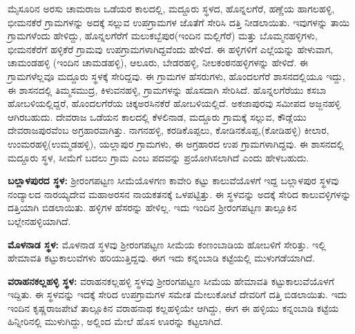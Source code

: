 \vskip -1pt

ಮೈಸೂರಿನ ಅರಸು ಚಾಮರಾಜ ಒಡೆಯರ ಕಾಲದಲ್ಲಿ, ಮದ್ದೂರು ಸ್ಥಳದ, ಹೊನ್ನಲಗೆರೆ, ಹಣ್ಣೆಯ ಹಾಗಲಹಳ್ಳಿ, ಭೀಮನಕೆರೆ ಗ್ರಾಮಗಳನ್ನು ಅದಕ್ಕೆ ಸಲ್ಲುವ ಉಪಗ್ರಾಮಗಳ ಜೊತೆಗೆ ಸೇರಿಸಿ ದತ್ತಿ ನೀಡಲಾಯಿತು. ಇವುಗಳನ್ನು ತಾಯಿ ಗ್ರಾಮಗಳೆಂದು ಹೇಳಿದ್ದು, ಹೊನ್ನಲಗೆರೆಗೆ ಮಲುಕಬ್ಬೆಪುರ(ಇಂದಿನ ಮಲ್ಲಿಗೆರೆ) ಮತ್ತು ಬೊಮ್ಮನಹಳ್ಳಿಗಳು, ಭೀಮನಕೆರೆಗೆ ಹಳ್ಳಿಕೆರೆ ಗ್ರಾಮವು ಉಪಗ್ರಾಮಗಳಾಗಿದ್ದವೆಂದು ಹೇಳಿದೆ. ಈ ಹಳ್ಳಿಗಳಿಗೆ ಎಲ್ಲೆಯನ್ನು ಹೇಳುವಾಗ, ಚಾಮಂಡಹಳ್ಳಿ (ಇಂದಿನ ಚಾಮಡಹಳ್ಳಿ), ಆಲೂರು, ಬೇಡರಹಳ್ಳಿ, ನೀಲಕಂಠನಹಳ್ಳಿಗಳನ್ನು ಹೇಳಿದೆ. ಈ ಗ್ರಾಮಗಳೆಲ್ಲವೂ ಮದ್ದೂರು ಸ್ಥಳಕ್ಕೆ ಸೇರಿದ್ದವು. ಈ ಗ್ರಾಮಗಳ ಹೆಸರುಗಳು, ಹೊಂದಲಗೆರೆ ಶಾಸನದಲ್ಲಿಯೂ ಇದ್ದು, ಈ ಶಾಸನದಲ್ಲಿ ತಿಮ್ಮಸಮುದ್ರ, ಕಿಳುವನಹಳ್ಳಿ, ಗ್ರಾಮಗಳನ್ನು ಹೊಸದಾಗಿ ಸೇರಿಸಿದೆ. ಹೊನ್ನಲಗೆರೆಯು ಕಸಬಾ ಹೋಬಳಿಯಲ್ಲಿದ್ದರೆ, ಹೊಂದಲಗೆರೆಯ ಚಿಕ್ಕಅರಸಿನಕೆರೆ ಹೋಬಳಿಯಲ್ಲಿದೆ. ಅಕಜಾಪುರವು ಸಮೀಪದ ಅಜ್ಜನಹಳ್ಳಿ ಆಗಿರಬಹುದು. ದೇವರಾಜ ಒಡೆಯನ ಕಾಲದಲ್ಲಿ ಕೆಳಲಿನಾಡ, ಮದ್ದೂರು ಗ್ರಾಮಕ್ಕೆ ಸಲ್ಲುವ, ಕೌಡ್ಲೆಯು ದೇವರಾಜಪುರವೆಂಬ ಅಗ್ರಹಾರವಾಗಿತ್ತು. ನಾಗನಹಳ್ಳಿ, ಕರಡಿಕೊಪ್ಪಲು, ಕೋಡಿನಕೊಪ್ಪ,(ಕೋಡಿಹಳ್ಳಿ) ಕೀಲಾರ, ಉಂಮರಹಳ್ಳಿ(ಉಮ್ಮಡಹಳ್ಳಿ), ಯಲ್ಲಾಪುರ ಗ್ರಾಮಗಳು, ಈ ಅಗ್ರಹಾರದ ಉಪ ಗ್ರಾಮಗಳಾಗಿದ್ದವು. ಈ ಶಾಸನದಲ್ಲಿ ಮದ್ದೂರು ಸ್ಥಳ, ಸೀಮೆಗೆ ಬದಲು ಗ್ರಾಮ ಎಂಬ ಪದವನ್ನು ಪ್ರಯೋಗಿಸಲಾಗಿದೆ ಎಂದು ಹೇಳಬಹುದು.

\textbf{ಬಲ್ಲಾಳಪುರದ ಸ್ಥಳ:} ಶ‍್ರೀರಂಗಪಟ್ಟಣ ಸೀಮೆಯೊಳಗಣ ಕಾವೇರಿ ಕಟ್ಟು ಕಾಲುವೆಯೊಳಗೆ ಇದ್ದ ಬಲ್ಲಾಳಪುರ ಸ್ಥಳವು ನಂದ್ಯಾಲದ ನಾರಯ್ಯದೇವ ಮಹಾಅರಸನ ನಾಯಕತನಕ್ಕೆ ಒಳಪಟ್ಟಿತ್ತು. ಈ ಸ್ಥಳವನ್ನು ಅದಕ್ಕೆ ಸೇರಿದ ಕಾಲುವಳ್ಳಿಗಳನ್ನು ದತ್ತಿಯಾಗಿ ಬಿಡಲಾಯಿತು. ಹಳ್ಳಿಗಳ ಹೆಸರನ್ನು ಹೇಳಿಲ್ಲ. ಇದು ಇಂದಿನ ಶ‍್ರೀರಂಗಪಟ್ಟಣ ತಾಲ್ಲೂಕಿನ ಬಲ್ಲೇನಹಳ್ಳಿಯಾಗಿದೆ.

\textbf{ಮೊಳನಾಡ ಸ್ಥಳ:} ಮೊಳನಾಡ ಸ್ಥಳವು ಶ‍್ರೀರಂಗಪಟ್ಟಣ ಸೀಮೆಯ ಕಂಣಂಬಾಡಿಯ ಹೋಬಳಿಗೆ ಸೇರಿತ್ತು. ಇಲ್ಲಿ ಹೇಮಾವತಿ ಕಟ್ಟುಕಾಲುವೆಗಳು ಹರಿಯುತ್ತಿದ್ದವು. ಈಗ ಇದು ಕನ್ನಂಬಾಡಿ ಕಟ್ಟೆಯಲ್ಲಿ ಮುಳುಗಡೆಯಾಗಿದೆ.

\textbf{ವರಾಹನಕಲ್ಲಹಳ್ಳಿ ಸ್ಥಳ:} ವರಾಹನಕಲ್ಲಹಳ್ಳಿ ಸ್ಥಳವು ಶ‍್ರೀರಂಗಪಟ್ಟಣ ಸೀಮೆಯ ಹೇಮಾವತಿ ಕಟ್ಟುಕಾಲುವೆಯೊಳಗೆ ಇದ್ದಿತು. ಈ ಸ್ಥಳವನ್ನು ಇದಕ್ಕೆ ಸೇರಿದ ಉಪಗ್ರಾಮಗಳ ಸಮೇತ ಮೇಲುಕೋಟೆ ದೇವರಿಗೆ ದತ್ತಿ ಬಿಡಲಾಯಿತು. ಇದು ಇಂದಿನ ಕೃಷ್ಣರಾಜಪೇಟೆ ತಾಲ್ಲೂಕಿನ ವರಾಹನಾಥ ಕಲ್ಲಹಳ್ಳಿಯೇ ಆಗಿದ್ದು, ಈಗ ಈ ಹಳ್ಳಿಯು ಕನ್ನಂಬಾಡಿ ಕಟ್ಟೆಯ ಹಿನ್ನೀರಿನಲ್ಲಿ ಮುಳುಗಿದ್ದು, ಅಲ್ಲಿಂದ ಮೇಲೆ ಹೊಸ ಊರನ್ನು ಕಟ್ಟಲಾಗಿದೆ.

